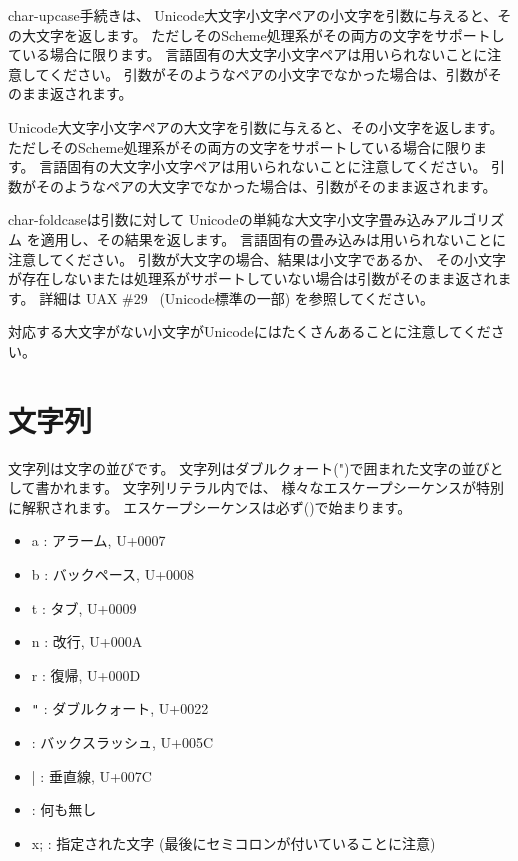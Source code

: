 \begin{entry}{%
}


{\cf char-upcase}手続きは、
Unicode大文字小文字ペアの小文字を引数に与えると、その大文字を返します。
ただしそのScheme処理系がその両方の文字をサポートしている場合に限ります。
言語固有の大文字小文字ペアは用いられないことに注意してください。
引数がそのようなペアの小文字でなかった場合は、引数がそのまま返されます。

Unicode大文字小文字ペアの大文字を引数に与えると、その小文字を返します。
ただしそのScheme処理系がその両方の文字をサポートしている場合に限ります。
言語固有の大文字小文字ペアは用いられないことに注意してください。
引数がそのようなペアの大文字でなかった場合は、引数がそのまま返されます。

{\cf char-foldcase}は引数に対して
Unicodeの単純な大文字小文字畳み込みアルゴリズム
を適用し、その結果を返します。
言語固有の畳み込みは用いられないことに注意してください。
引数が大文字の場合、結果は小文字であるか、
その小文字が存在しないまたは処理系がサポートしていない場合は引数がそのまま返されます。
詳細は UAX \#29~\cite{uax29} (Unicode標準の一部) を参照してください。

対応する大文字がない小文字がUnicodeにはたくさんあることに注意してください。

\end{entry}


\section{文字列}
\label{stringsection}

文字列は文字の並びです。
\vest 文字列はダブルクォート({\cf "})で囲まれた文字の並びとして書かれます。
文字列リテラル内では、
様々なエスケープシーケンスが特別に解釈されます。
エスケープシーケンスは必ず(\backwhack{})で始まります。

\begin{itemize}
\item{\cf\backwhack{}a} : アラーム, U+0007
\item{\cf\backwhack{}b} : バックペース, U+0008 
\item{\cf\backwhack{}t} : タブ, U+0009 
\item{\cf\backwhack{}n} : 改行, U+000A 
\item{\cf\backwhack{}r} : 復帰, U+000D 
\item{\cf\backwhack{}}\verb|"| : ダブルクォート, U+0022 
\item{\cf\backwhack{}\backwhack{}} : バックスラッシュ, U+005C 
\item{\cf\backwhack{}|} : 垂直線, U+007C
\item{\cf\backwhack{}
      } : 何も無し
\item{\cf\backwhack{}x;} : 指定された文字
(最後にセミコロンが付いていることに注意)
\end{itemize}

